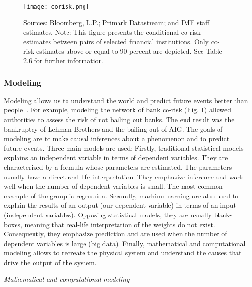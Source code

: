 \begin{figure}[h!]
\begin{center}
\texttt{[image: corisk.png]}
\end{center}
\caption{Sources: Bloomberg, L.P.; Primark Datastream; and IMF staff estimates.
Note: This figure presents the conditional co-risk estimates between pairs of selected financial
institutions. Only co-risk estimates above or equal to 90 percent are depicted. See Table 2.6 for further
information.~\citep{corisk2009}}
\label{fig:corisk}
\end{figure}


\subsubsection{Modeling}
Modeling allows us to understand the world and predict future events better than people~\citep{tetlock2005}.
For example, modeling the network of bank co-risk (Fig. \ref{fig:corisk}) allowed authorities to assess the risk of not bailing out banks.
The end result was the bankruptcy of Lehman Brothers and the bailing out of AIG.
The goals of modeling are to make causal inferences about a phenomenon and to predict future events.
Three main models are used:
Firstly, traditional statistical models explains an independent variable in terms of dependent variables. 
They are characterized by a formula whose parameters are estimated.
The parameters usually have a direct real-life interpretation.
They emphasize inference and work well when the number of dependent variables is small.
The most common example of the group is regression.
Secondly, machine learning are also used to explain the results of an output (our dependent variable) in terms of an input (independent variables).
Opposing statistical models, they are usually black-boxes, meaning that real-life interpretation of the weights do not exist.
Consequently, they emphasize prediction and are used when the number of dependent variables is large (big data).
Finally, mathematical and computational modeling allows to recreate the physical system and understand the causes that drive the output of the system.

\textit{Mathematical and computational modeling}


